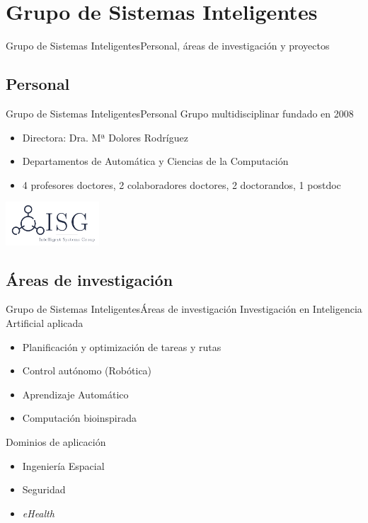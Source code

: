 \documentclass[10pt,compress]{beamer} %
\begin{document}
\section{Grupo de Sistemas Inteligentes}
{
    \sectionheaderWhite %
    \begin{frame}{Grupo de Sistemas Inteligentes}{Personal, áreas de investigación y proyectos}
    \end{frame}
}

\subsection{Personal}
\begin{frame}{Grupo de Sistemas Inteligentes}{Personal}
    Grupo multidisciplinar fundado en 2008
        \begin{itemize}
        \item Directora: Dra. Mª Dolores Rodríguez
        \item Departamentos de Automática y Ciencias de la Computación
        \item 4 profesores doctores, 2 colaboradores doctores, 2 doctorandos, 1 postdoc
        \end{itemize}

     \centering
     \bigskip 
     \includegraphics[width=3.5cm]{figs/isg-color}
    \note{    
    }
\end{frame}

\subsection{Áreas de investigación}
\begin{frame}{Grupo de Sistemas Inteligentes}{Áreas de investigación}
    Investigación en Inteligencia Artificial aplicada
    \begin{itemize}
        \item Planificación y optimización de tareas y rutas
        \item Control autónomo (Robótica)
        \item Aprendizaje Automático
        \item Computación bioinspirada
        \end{itemize}

    Dominios de aplicación
        \begin{itemize}
        \item Ingeniería Espacial
        \item Seguridad
        \item \textit{eHealth}
        \end{itemize}
        
    \note{    
    }
\end{frame}
\end{document}
